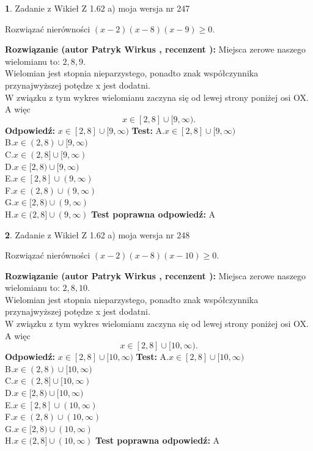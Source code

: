 \documentclass[12pt, a4paper]{article}
\theoremstyle{definition} %
\newtheorem{zad}{}
\newcommand{\zadStart}[1]{\begin{zad}#1\newline}
\newcommand{\zadStop}{\end{zad}}
\newcommand{\rozwStart}[2]{\noindent \textbf{Rozwiązanie (autor #1 , recenzent #2): }\newline}
\newcommand{\rozwStop}{\newline}
\newcommand{\odpStart}{\noindent \textbf{Odpowiedź:}\newline}
\newcommand{\odpStop}{\newline}
\newcommand{\testStart}{\noindent \textbf{Test:}\newline}
\newcommand{\testStop}{\newline}
\newcommand{\kluczStart}{\noindent \textbf{Test poprawna odpowiedź:}\newline}
\newcommand{\kluczStop}{\newline}
\begin{document}
\zadStart{Zadanie z Wikieł Z 1.62 a) moja wersja nr 247}

Rozwiązać nierówności $(x-2)(x-8)(x-9)\ge0$.
\zadStop
\rozwStart{Patryk Wirkus}{}
Miejsca zerowe naszego wielomianu to: $2, 8, 9$.\\
Wielomian jest stopnia nieparzystego, ponadto znak współczynnika przy\linebreak najwyższej potędze x jest dodatni.\\ W związku z tym wykres wielomianu zaczyna się od lewej strony poniżej osi OX. A więc $$x \in [2,8] \cup [9,\infty).$$
\rozwStop
\odpStart
$x \in [2,8] \cup [9,\infty)$
\odpStop
\testStart
A.$x \in [2,8] \cup [9,\infty)$\\
B.$x \in (2,8) \cup [9,\infty)$\\
C.$x \in (2,8] \cup [9,\infty)$\\
D.$x \in [2,8) \cup [9,\infty)$\\
E.$x \in [2,8] \cup (9,\infty)$\\
F.$x \in (2,8) \cup (9,\infty)$\\
G.$x \in [2,8) \cup (9,\infty)$\\
H.$x \in (2,8] \cup (9,\infty)$
\testStop
\kluczStart
A
\kluczStop



\zadStart{Zadanie z Wikieł Z 1.62 a) moja wersja nr 248}

Rozwiązać nierówności $(x-2)(x-8)(x-10)\ge0$.
\zadStop
\rozwStart{Patryk Wirkus}{}
Miejsca zerowe naszego wielomianu to: $2, 8, 10$.\\
Wielomian jest stopnia nieparzystego, ponadto znak współczynnika przy\linebreak najwyższej potędze x jest dodatni.\\ W związku z tym wykres wielomianu zaczyna się od lewej strony poniżej osi OX. A więc $$x \in [2,8] \cup [10,\infty).$$
\rozwStop
\odpStart
$x \in [2,8] \cup [10,\infty)$
\odpStop
\testStart
A.$x \in [2,8] \cup [10,\infty)$\\
B.$x \in (2,8) \cup [10,\infty)$\\
C.$x \in (2,8] \cup [10,\infty)$\\
D.$x \in [2,8) \cup [10,\infty)$\\
E.$x \in [2,8] \cup (10,\infty)$\\
F.$x \in (2,8) \cup (10,\infty)$\\
G.$x \in [2,8) \cup (10,\infty)$\\
H.$x \in (2,8] \cup (10,\infty)$
\testStop
\kluczStart
A
\kluczStop
\end{document}
